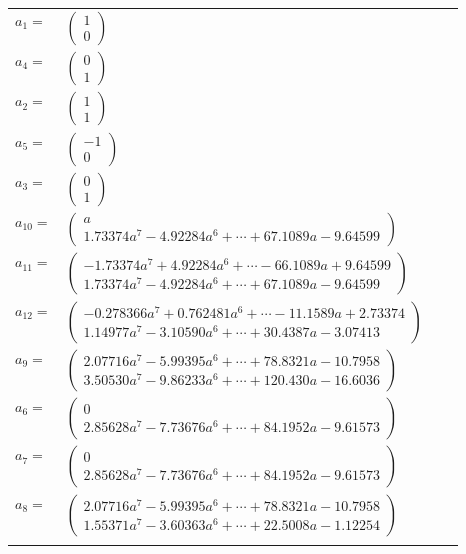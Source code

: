 \documentclass[1p]{elsarticle_modified}
\theoremstyle{definition}
\begin{document}
\begin{tabular}{m{7pt} m{180pt} m{7pt} m{180pt} }
\flushright $a_{1}=$&$\begin{pmatrix}1\\0\end{pmatrix}$ \\
\flushright $a_{4}=$&$\begin{pmatrix}0\\1\end{pmatrix}$ \\
\flushright $a_{2}=$&$\begin{pmatrix}1\\1\end{pmatrix}$ \\
\flushright $a_{5}=$&$\begin{pmatrix}-1\\0\end{pmatrix}$ \\
\flushright $a_{3}=$&$\begin{pmatrix}0\\1\end{pmatrix}$ \\
\flushright $a_{10}=$&$\begin{pmatrix}a\\1.73374 a^{7}-4.92284 a^{6}+\cdots+67.1089 a-9.64599\end{pmatrix}$ \\
\flushright $a_{11}=$&$\begin{pmatrix}-1.73374 a^{7}+4.92284 a^{6}+\cdots-66.1089 a+9.64599\\1.73374 a^{7}-4.92284 a^{6}+\cdots+67.1089 a-9.64599\end{pmatrix}$ \\
\flushright $a_{12}=$&$\begin{pmatrix}-0.278366 a^{7}+0.762481 a^{6}+\cdots-11.1589 a+2.73374\\1.14977 a^{7}-3.10590 a^{6}+\cdots+30.4387 a-3.07413\end{pmatrix}$ \\
\flushright $a_{9}=$&$\begin{pmatrix}2.07716 a^{7}-5.99395 a^{6}+\cdots+78.8321 a-10.7958\\3.50530 a^{7}-9.86233 a^{6}+\cdots+120.430 a-16.6036\end{pmatrix}$ \\
\flushright $a_{6}=$&$\begin{pmatrix}0\\2.85628 a^{7}-7.73676 a^{6}+\cdots+84.1952 a-9.61573\end{pmatrix}$ \\
\flushright $a_{7}=$&$\begin{pmatrix}0\\2.85628 a^{7}-7.73676 a^{6}+\cdots+84.1952 a-9.61573\end{pmatrix}$ \\
\flushright $a_{8}=$&$\begin{pmatrix}2.07716 a^{7}-5.99395 a^{6}+\cdots+78.8321 a-10.7958\\1.55371 a^{7}-3.60363 a^{6}+\cdots+22.5008 a-1.12254\end{pmatrix}$\\&\end{tabular}
\end{document}
